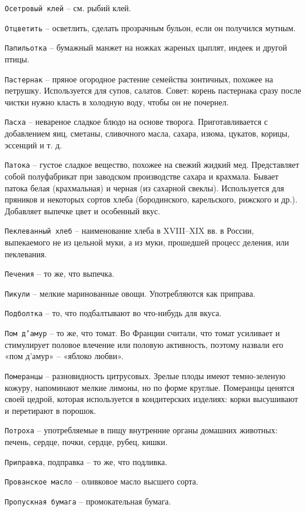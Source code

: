 {\tt Осетровый клей} – см. рыбий клей.

{\tt Отцветить} – осветлить, сделать прозрачным бульон, если он получился мутным.

{\tt Папильотка} – бумажный манжет на ножках жареных цыплят, индеек и другой птицы.

{\tt Пастернак} – пряное огородное растение семейства зонтичных, похожее на петрушку. Используется для супов, салатов. Совет: корень пастернака сразу после чистки нужно класть в холодную воду, чтобы он не почернел.

{\tt Пасха} – невареное сладкое блюдо на основе творога. Приготавливается с добавлением яиц, сметаны, сливочного масла, сахара, изюма, цукатов, корицы, эссенций и т. д.

{\tt Патока} – густое сладкое вещество, похожее на свежий жидкий мед. Представляет собой полуфабрикат при заводском производстве сахара и крахмала. Бывает патока белая (крахмальная) и черная (из сахарной свеклы). Используется для пряников и некоторых сортов хлеба (бородинского, карельского, рижского и др.). Добавляет выпечке цвет и особенный вкус.

{\tt Пеклеванный хлеб} – наименование хлеба в XVIII–XIX вв. в России, выпекаемого не из цельной муки, а из муки, прошедшей процесс деления, или пеклевания. 

{\tt Печения} – то же, что выпечка.

{\tt Пикули} – мелкие маринованные овощи. Употребляются как приправа.

{\tt Подболтка} – то, что подбалтывают во что-нибудь для вкуса.

{\tt Пом д’амур} – то же, что томат. Во Франции считали, что томат усиливает и стимулирует половое влечение или половую активность, поэтому назвали его «пом д’амур» – «яблоко любви».

{\tt Померанцы} – разновидность цитрусовых. Зрелые плоды имеют темно-зеленую кожуру, напоминают мелкие лимоны, но по форме круглые. Померанцы ценятся своей цедрой, которая используется в кондитерских изделиях: корки высушивают и перетирают в порошок.

{\tt Потроха} – употребляемые в пищу внутренние органы домашних животных: печень, сердце, почки, сердце, рубец, кишки.

{\tt Приправка}, подправка – то же, что подливка.

{\tt Прованское масло} – оливковое масло высшего сорта.

{\tt Пропускная бумага} – промокательная бумага.

